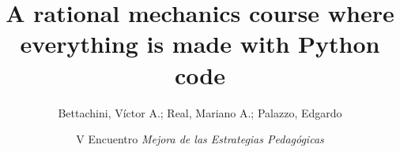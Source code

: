 \documentclass[aspectratio=169]{beamer}
\begin{document}
\title{A rational mechanics course where everything is made with Python code}
\author[vbettachini@unlam.edu.ar]{Bettachini, Víctor A.; Real, Mariano A.; Palazzo, Edgardo}
\date[2023-09-22]{
	V Encuentro \emph{Mejora de las Estrategias Pedagógicas}%
}


\begin{frame} 
  \titlepage
\end{frame}

\end{document}
